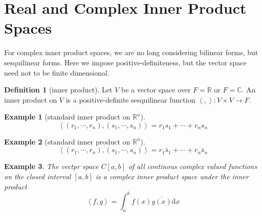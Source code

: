 \documentclass{book}
\newtheorem{example}{Example}[section]
\theoremstyle{definition}
\newtheorem{definition}{Definition}[section]
\begin{document}
\section{Real and Complex Inner Product Spaces}
For complex inner product spaces, we are no long considering bilinear forms, but sesquilinear forms. Here we impose positive-definiteness, but the vector space need not to be finite dimensional.
\begin{definition}[inner product]
Let $V$ be a vector space over $F=\mathbb{R}$ or $F=\mathbb{C}$. An inner product on $V$ is a positive-definite sesquilinear function $\left \langle , \right \rangle :V\times V\longrightarrow F$.


\end{definition}

\begin{example}[standard inner product on $\mathbb{R}^n$]
\begin{equation*}
\left \langle (r_1,\cdots,r_n),(s_1,\cdots,s_n) \right \rangle=r_1s_1+\cdots+r_ns_n
\end{equation*}
\end{example}
\begin{example}[standard inner product on $\mathbb{R}^n$]
\begin{equation*}
\left \langle (r_1,\cdots,r_n),(s_1,\cdots,s_n) \right \rangle=r_1\bar{s}_1+\cdots+r_n\bar{s}_n
\end{equation*}
\end{example}
\begin{example}
The vectpr space $C[a,b]$ of all continous complex valued functions on the closed interval $[a,b]$ is a complex inner product space under the inner product 
\begin{equation*}
\left \langle f,g\right \rangle =\int_a^bf(x)\overline{g(x)}\mathrm{d}x
\end{equation*}
\end{example}
\end{document}

